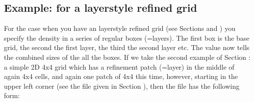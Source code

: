 \documentclass[letterpaper,10pt,english]{sphinxmanual}
\begin{document}
\subsection{Example:  for a layer\sphinxhyphen{}style refined grid}
\label{\detokenize{inputoutputfiles:example-dust-density-inp-for-a-layer-style-refined-grid}}
For the case when you have an layer\sphinxhyphen{}style refined grid (see Sections
{\hyperref[\detokenize{inputoutputfiles:sec-amr-grid-layered}]{}} and {\hyperref[\detokenize{gridding:sec-layered-amr}]{}}) you specify the
density in a series of regular boxes (=layers). The first box is the base
grid, the second the first layer, the third the second layer etc.  The value
 now tells the combined sizes of the all the boxes. If we
take the second example of Section {\hyperref[\detokenize{inputoutputfiles:sec-amr-grid-layered}]{}}: a simple 2\sphinxhyphen{}D
4x4 grid which has a refinement patch (=layer) in the middle of again 4x4
cells, and again one patch of 4x4 this time, however, starting in the upper
left corner (see the  file given in Section
{\hyperref[\detokenize{inputoutputfiles:sec-amr-grid-layered}]{}}), then the  file
has the following form:
\end{document}
